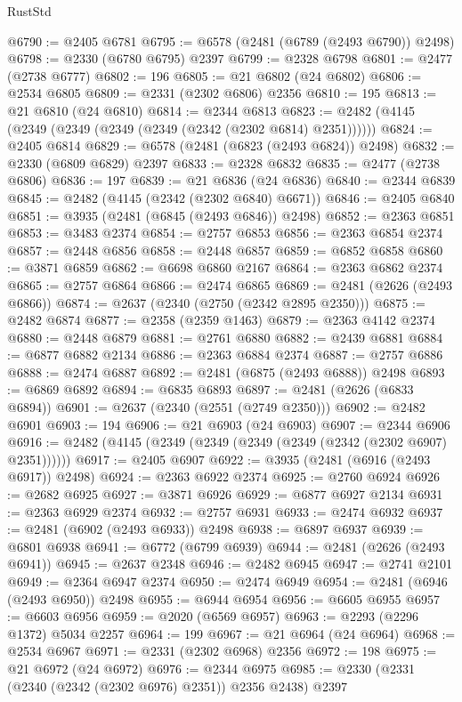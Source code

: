 \begin{lexlean}{RustStd}
\begin{coremodule}
@6790 := @2405 @6781
@6795 := @6578 (@2481 (@6789 (@2493 @6790)) @2498)
@6798 := @2330 (@6780 @6795) @2397
@6799 := @2328 @6798
@6801 := @2477 (@2738 @6777)
@6802 := 196
@6805 := @21 @6802 (@24 @6802)
@6806 := @2534 @6805
@6809 := @2331 (@2302 @6806) @2356
@6810 := 195
@6813 := @21 @6810 (@24 @6810)
@6814 := @2344 @6813
@6823 := @2482 (@4145 (@2349 (@2349 (@2349 (@2349 (@2342 (@2302 @6814) @2351))))))
@6824 := @2405 @6814
@6829 := @6578 (@2481 (@6823 (@2493 @6824)) @2498)
@6832 := @2330 (@6809 @6829) @2397
@6833 := @2328 @6832
@6835 := @2477 (@2738 @6806)
@6836 := 197
@6839 := @21 @6836 (@24 @6836)
@6840 := @2344 @6839
@6845 := @2482 (@4145 (@2342 (@2302 @6840) @6671))
@6846 := @2405 @6840
@6851 := @3935 (@2481 (@6845 (@2493 @6846)) @2498)
@6852 := @2363 @6851
@6853 := @3483 @2374
@6854 := @2757 @6853
@6856 := @2363 @6854 @2374
@6857 := @2448 @6856
@6858 := @2448 @6857
@6859 := @6852 @6858
@6860 := @3871 @6859
@6862 := @6698 @6860 @2167
@6864 := @2363 @6862 @2374
@6865 := @2757 @6864
@6866 := @2474 @6865
@6869 := @2481 (@2626 (@2493 @6866))
@6874 := @2637 (@2340 (@2750 (@2342 @2895 @2350)))
@6875 := @2482 @6874
@6877 := @2358 (@2359 @1463)
@6879 := @2363 @4142 @2374
@6880 := @2448 @6879
@6881 := @2761 @6880
@6882 := @2439 @6881
@6884 := @6877 @6882 @2134
@6886 := @2363 @6884 @2374
@6887 := @2757 @6886
@6888 := @2474 @6887
@6892 := @2481 (@6875 (@2493 @6888)) @2498
@6893 := @6869 @6892
@6894 := @6835 @6893
@6897 := @2481 (@2626 (@6833 @6894))
@6901 := @2637 (@2340 (@2551 (@2749 @2350)))
@6902 := @2482 @6901
@6903 := 194
@6906 := @21 @6903 (@24 @6903)
@6907 := @2344 @6906
@6916 := @2482 (@4145 (@2349 (@2349 (@2349 (@2349 (@2342 (@2302 @6907) @2351))))))
@6917 := @2405 @6907
@6922 := @3935 (@2481 (@6916 (@2493 @6917)) @2498)
@6924 := @2363 @6922 @2374
@6925 := @2760 @6924
@6926 := @2682 @6925
@6927 := @3871 @6926
@6929 := @6877 @6927 @2134
@6931 := @2363 @6929 @2374
@6932 := @2757 @6931
@6933 := @2474 @6932
@6937 := @2481 (@6902 (@2493 @6933)) @2498
@6938 := @6897 @6937
@6939 := @6801 @6938
@6941 := @6772 (@6799 @6939)
@6944 := @2481 (@2626 (@2493 @6941))
@6945 := @2637 @2348
@6946 := @2482 @6945
@6947 := @2741 @2101
@6949 := @2364 @6947 @2374
@6950 := @2474 @6949
@6954 := @2481 (@6946 (@2493 @6950)) @2498
@6955 := @6944 @6954
@6956 := @6605 @6955
@6957 := @6603 @6956
@6959 := @2020 (@6569 @6957)
@6963 := @2293 (@2296 @1372) @5034 @2257
@6964 := 199
@6967 := @21 @6964 (@24 @6964)
@6968 := @2534 @6967
@6971 := @2331 (@2302 @6968) @2356
@6972 := 198
@6975 := @21 @6972 (@24 @6972)
@6976 := @2344 @6975
@6985 := @2330 (@2331 (@2340 (@2342 (@2302 @6976) @2351)) @2356 @2438) @2397

\end{coremodule}
\end{lexlean}
